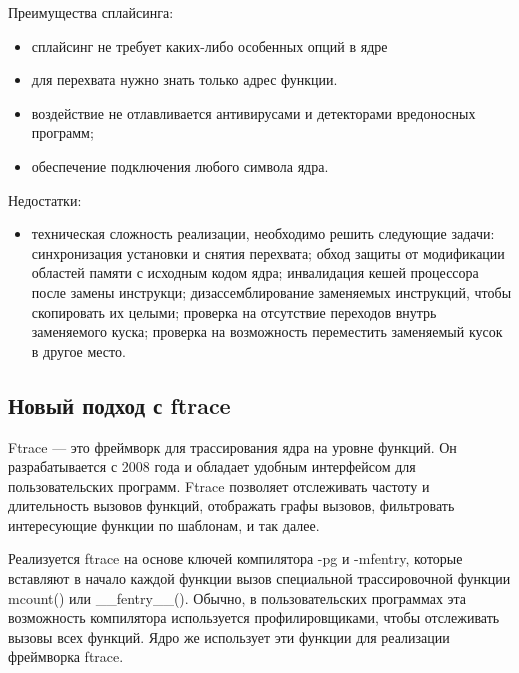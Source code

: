Преимущества сплайсинга:
\begin{itemize}
	\item сплайсинг не требует каких-либо особенных опций в ядре
	\item для перехвата нужно знать только адрес функции.
	\item воздействие не отлавливается антивирусами и детекторами
	вредоносных программ;
	\item обеспечение подключения любого символа ядра.
\end{itemize}

Недостатки:
\begin{itemize}
	\item техническая сложность реализации, необходимо решить следующие задачи: синхронизация установки и снятия перехвата; обход защиты от модификации областей памяти с исходным кодом ядра; инвалидация кешей процессора после замены инструкци; дизассемблирование заменяемых инструкций, чтобы скопировать их целыми; проверка на отсутствие переходов внутрь заменяемого куска; проверка на возможность переместить заменяемый кусок в другое место.
\end{itemize}

\subsection{Новый подход с ftrace}
Ftrace — это фреймворк для трассирования ядра на уровне функций. Он разрабатывается с 2008 года и обладает удобным интерфейсом для пользовательских программ. Ftrace позволяет отслеживать частоту и длительность вызовов функций, отображать графы вызовов, фильтровать интересующие функции по шаблонам, и так далее.

Реализуется ftrace на основе ключей компилятора -pg и -mfentry, которые вставляют в начало каждой функции вызов специальной трассировочной функции mcount() или \_\_fentry\_\_(). Обычно, в пользовательских программах эта возможность компилятора используется профилировщиками, чтобы отслеживать вызовы всех функций. Ядро же использует эти функции для реализации фреймворка ftrace.

